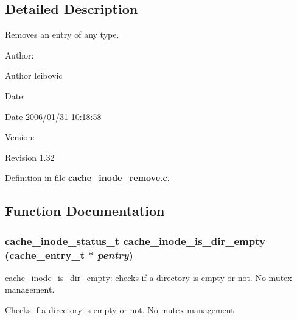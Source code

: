 \subsection{Detailed Description}
Removes an entry of any type. 

\begin{Desc}
\item[Author:]\begin{Desc}
\item[Author]leibovic \end{Desc}
\end{Desc}
\begin{Desc}
\item[Date:]\begin{Desc}
\item[Date]2006/01/31 10:18:58 \end{Desc}
\end{Desc}
\begin{Desc}
\item[Version:]\begin{Desc}
\item[Revision]1.32 \end{Desc}
\end{Desc}


Definition in file {\bf cache\_\-inode\_\-remove.c}.

\subsection{Function Documentation}
\subsubsection{\setlength{\rightskip}{0pt plus 5cm}cache\_\-inode\_\-status\_\-t cache\_\-inode\_\-is\_\-dir\_\-empty (cache\_\-entry\_\-t $\ast$ {\em pentry})}\label{cache__inode__remove_8c_a0}


cache\_\-inode\_\-is\_\-dir\_\-empty: checks if a directory is empty or not. No mutex management.

Checks if a directory is empty or not. No mutex management

